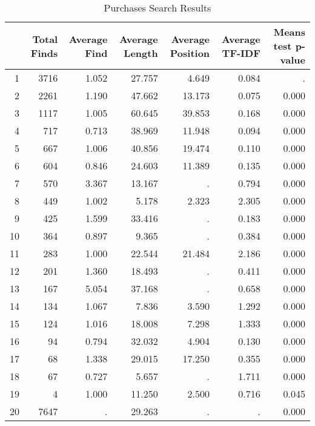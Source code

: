 \begin{table}[!htbp]
\centering
\caption{Purchases Search Results} 
\label{taba2}
\begin{tabular}{rrrrrrr}
  \hline
 & Total Finds & Average Find & Average Length & Average Position & Average TF-IDF & Means test p-value \\ 
  \hline
1 & 3716 & 1.052 & 27.757 & 4.649 & 0.084 & . \\ 
  2 & 2261 & 1.190 & 47.662 & 13.173 & 0.075 & 0.000 \\ 
  3 & 1117 & 1.005 & 60.645 & 39.853 & 0.168 & 0.000 \\ 
  4 & 717 & 0.713 & 38.969 & 11.948 & 0.094 & 0.000 \\ 
  5 & 667 & 1.006 & 40.856 & 19.474 & 0.110 & 0.000 \\ 
  6 & 604 & 0.846 & 24.603 & 11.389 & 0.135 & 0.000 \\ 
  7 & 570 & 3.367 & 13.167 & . & 0.794 & 0.000 \\ 
  8 & 449 & 1.002 & 5.178 & 2.323 & 2.305 & 0.000 \\ 
  9 & 425 & 1.599 & 33.416 & . & 0.183 & 0.000 \\ 
  10 & 364 & 0.897 & 9.365 & . & 0.384 & 0.000 \\ 
  11 & 283 & 1.000 & 22.544 & 21.484 & 2.186 & 0.000 \\ 
  12 & 201 & 1.360 & 18.493 & . & 0.411 & 0.000 \\ 
  13 & 167 & 5.054 & 37.168 & . & 0.658 & 0.000 \\ 
  14 & 134 & 1.067 & 7.836 & 3.590 & 1.292 & 0.000 \\ 
  15 & 124 & 1.016 & 18.008 & 7.298 & 1.333 & 0.000 \\ 
  16 & 94 & 0.794 & 32.032 & 4.904 & 0.130 & 0.000 \\ 
  17 & 68 & 1.338 & 29.015 & 17.250 & 0.355 & 0.000 \\ 
  18 & 67 & 0.727 & 5.657 & . & 1.711 & 0.000 \\ 
  19 & 4 & 1.000 & 11.250 & 2.500 & 0.716 & 0.045 \\ 
  20 & 7647 & . & 29.263 & . & . & 0.000 \\ 
   \hline
\end{tabular}
\end{table}
